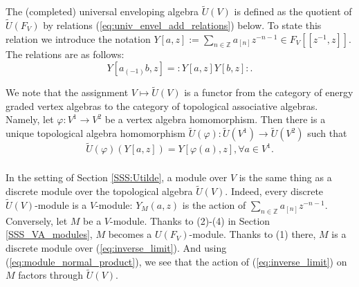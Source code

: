 \documentclass{amsart}
\theoremstyle{definition}
\newcommand{\Z}{\mathbb{Z}}
\numberwithin{equation}{section}
\begin{document}
The (completed) universal enveloping algebra $\widetilde{U}(V)$ is  defined as the quotient of $\widetilde{U}(F_V)$ by relations (\ref{eq:univ_envel_add_relations})
below. To state this relation we introduce the notation $Y[a,z]:=\sum_{n\in \Z}a_{[n]}z^{-n-1}\in F_V[[z^{-1},z]]$. The relations are as follows:
\begin{equation}\label{eq:univ_envel_add_relations}Y[a_{(-1)}b,z]=:Y[a,z]Y[b,z]:.
\end{equation}


We note that the assignment $V\mapsto \widetilde{U}(V)$ is a functor from the category of energy graded vertex algebras to the category of topological associative algebras. Namely, let $\varphi:V^1\rightarrow V^2$ be a vertex algebra homomorphism. Then there is a unique topological algebra homomorphism
$\widetilde{U}(\varphi): \widetilde{U}(V^1)\rightarrow \widetilde{U}(V^2)$ such that
\begin{equation}\label{eq:U_homom}
\widetilde{U}(\varphi)(Y[a,z])=Y[\varphi(a),z], \forall a\in V^1.
\end{equation}

\subsubsection{} In the setting of Section \ref{SSS:Utilde}, a module over $V$ is the same thing as a discrete module over the topological algebra $\tilde{U}(V)$. Indeed, every discrete $\tilde{U}(V)$-module is a $V$-module: $Y_M(a,z)$
is the action of $\sum_{n\in \Z}a_{[n]}z^{-n-1}$. Conversely, let $M$ be a $V$-module. Thanks to
(2)-(4) in Section \ref{SSS_VA_modules}, $M$ becomes a $U(F_V)$-module. Thanks to (1) there, $M$ is a discrete module over (\ref{eq:inverse_limit}). And using (\ref{eq:module_normal_product}), we see that the action of (\ref{eq:inverse_limit}) on $M$ factors through $\tilde{U}(V)$.
\end{document}
